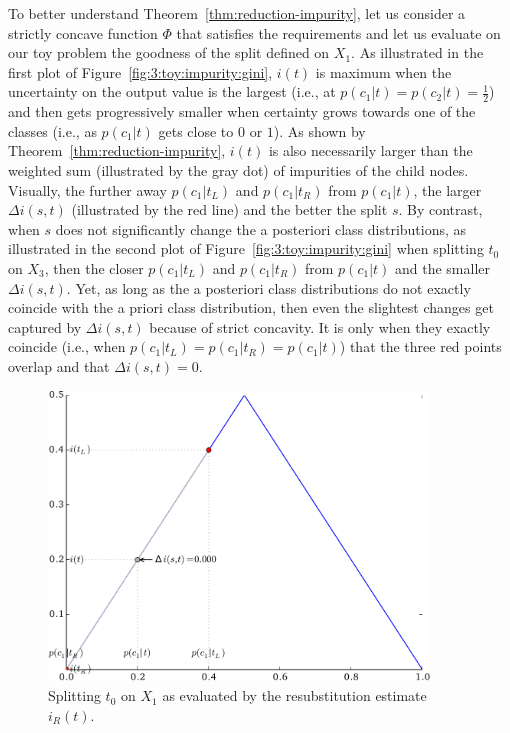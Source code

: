 To better understand Theorem~\ref{thm:reduction-impurity}, let us consider a
strictly concave function $\Phi$ that satisfies the requirements and let us
evaluate on our toy problem the goodness of the split defined on $X_1$.  As
illustrated in the first plot of Figure~\ref{fig:3:toy:impurity:gini},  $i(t)$
is maximum when the uncertainty on the output value is the largest
(i.e., at $p(c_1|t)=p(c_2|t)=\tfrac{1}{2}$) and then gets progressively smaller
when certainty grows towards one of the classes (i.e., as $p(c_1|t)$
gets close to $0$ or $1$). As shown by Theorem~\ref{thm:reduction-impurity},
$i(t)$ is also necessarily larger than the weighted sum (illustrated by the gray
dot) of impurities of the child nodes. Visually, the further away $p(c_1|t_L)$
and $p(c_1|t_R)$ from $p(c_1|t)$, the larger $\Delta i(s,t)$ (illustrated by
the red line) and the better the split $s$. By contrast, when $s$ does not
significantly change the a posteriori class distributions, as illustrated in
the second plot of Figure~\ref{fig:3:toy:impurity:gini} when splitting $t_0$ on
$X_3$, then the closer $p(c_1|t_L)$ and $p(c_1|t_R)$ from $p(c_1|t)$ and the
smaller $\Delta i(s,t)$. Yet, as long as the a posteriori class distributions
do not exactly coincide with the a priori class distribution, then even the
slightest changes get captured by $\Delta i(s, t)$ because of strict concavity.
It is only when they exactly coincide (i.e., when
$p(c_1|t_L)=p(c_1|t_R)=p(c_1|t)$) that the three red points overlap and that
$\Delta i(s,t)=0$.

\begin{figure}
\centering
\includegraphics[width=0.9\textwidth]{figures/ch3_toy_x1_error.pdf}
\caption{Splitting $t_0$ on $X_1$ as evaluated by the resubstitution estimate $i_R(t)$.}
\label{fig:3:toy:impurity:error}
\end{figure}


